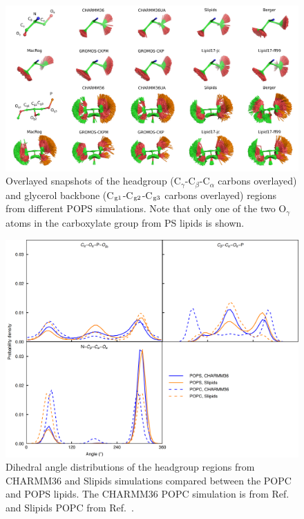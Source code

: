 \documentclass[journal=jpcbfk,manuscript=article]{achemso}
\begin{document}
\begin{figure}[]
  \centering
  \includegraphics[width=18.0cm]{../Figs/figS8.png}
  \caption{\label{HGandGLYstructuresPS}
    Overlayed snapshots of the headgroup (C$_\gamma$-C$_\beta$-C$_\alpha$ carbons overlayed) and
    glycerol backbone (C$_{\rm g1}$-C$_{\rm g2}$-C$_{\rm g3}$ carbons overlayed) regions from different POPS simulations.
    Note that only one of the two O$_\gamma$ atoms in the carboxylate group from PS lipids is shown.
  }
\end{figure}

\begin{figure}[]
  \centering
  \includegraphics[width=16.0cm]{../Figs/figS11.png}
  \caption{\label{dihedralsHGpc}
    Dihedral angle distributions of the headgroup regions from CHARMM36 and Slipids simulations
    compared between the POPC and POPS lipids. 
    The CHARMM36 POPC simulation is from Ref.~ and Slipids POPC from Ref.~.
  }
\end{figure}
\end{document}

